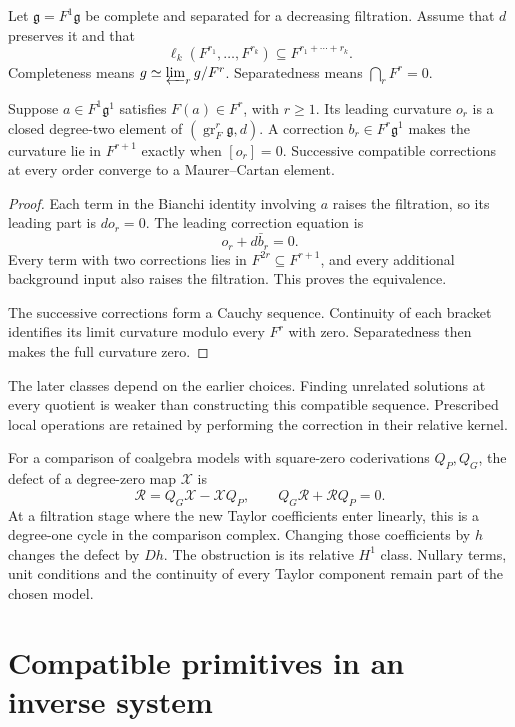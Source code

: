 Let $\mathfrak g=F^1\mathfrak g$ be complete and separated for a
decreasing filtration. Assume that $d$ preserves it and that
\[
 \ell_k(F^{r_1},\ldots,F^{r_k})
       \subseteq F^{r_1+\cdots+r_k}.
\]
Completeness means $\mathfrak g\simeq\varprojlim_r\mathfrak g/F^r$.
Separatedness means $\bigcap_rF^r=0$.

\begin{theorem}\label{mht:thm:filtered-descent-corrections}
Suppose $a\in F^1\mathfrak g^1$ satisfies $F(a)\in F^r$, with
$r\geq1$. Its leading curvature $o_r$ is a closed degree-two
element of $(\operatorname{gr}^r_F\mathfrak g,d)$.
A correction $b_r\in F^r\mathfrak g^1$ makes the curvature lie in
$F^{r+1}$ exactly when $[o_r]=0$. Successive compatible corrections
at every order converge to a Maurer--Cartan element.
\end{theorem}

\begin{proof}
Each term in the Bianchi identity involving $a$ raises the
filtration, so its leading part is $do_r=0$. The leading correction
equation is
\[
 o_r+d\bar b_r=0.
\]
Every term with two corrections lies in $F^{2r}\subseteq F^{r+1}$,
and every additional background input also raises the filtration.
This proves the equivalence.

The successive corrections form a
Cauchy sequence. Continuity of each bracket identifies its limit
curvature modulo every $F^r$ with zero. Separatedness then makes
the full curvature zero.
\end{proof}

The later classes depend on the earlier choices. Finding unrelated
solutions at every quotient is weaker than constructing this
compatible sequence. Prescribed local operations are retained by
performing the correction in their relative kernel.

For a comparison of coalgebra models with square-zero coderivations
$Q_P,Q_G$, the defect of a degree-zero map $\mathcal X$ is
\[
 \mathcal R=Q_G\mathcal X-\mathcal XQ_P,
 \qquad Q_G\mathcal R+\mathcal RQ_P=0.
\]
At a filtration stage where the new Taylor coefficients enter
linearly, this is a degree-one cycle in the comparison complex.
Changing those coefficients by $h$ changes the defect by $D h$.
The obstruction is its relative $H^1$ class. Nullary terms, unit
conditions and the continuity of every Taylor component remain
part of the chosen model.

\section{Compatible primitives in an inverse system}
\label{mht:sec:descent-towers}

